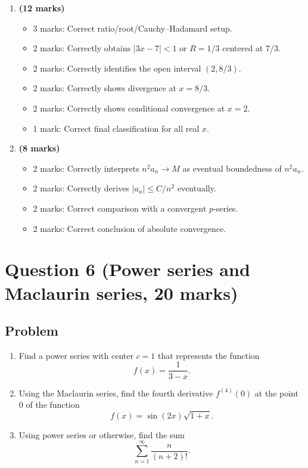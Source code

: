 \documentclass[12pt]{article}
\begin{document}
\begin{enumerate}[label=(\alph*)]
\item \textbf{(12 marks)}
\begin{itemize}
\item 3 marks: Correct ratio/root/Cauchy--Hadamard setup.
\item 2 marks: Correctly obtains $|3x-7|<1$ or $R=1/3$ centered at $7/3$.
\item 2 marks: Correctly identifies the open interval $(2,8/3)$.
\item 2 marks: Correctly shows divergence at $x=8/3$.
\item 2 marks: Correctly shows conditional convergence at $x=2$.
\item 1 mark: Correct final classification for all real $x$.
\end{itemize}

\item \textbf{(8 marks)}
\begin{itemize}
\item 2 marks: Correctly interprets $n^2a_n\to M$ as eventual boundedness of $n^2a_n$.
\item 2 marks: Correctly derives $|a_n|\le C/n^2$ eventually.
\item 2 marks: Correct comparison with a convergent $p$-series.
\item 2 marks: Correct conclusion of absolute convergence.
\end{itemize}
\end{enumerate}

\newpage
\section{Question 6 (Power series and Maclaurin series, 20 marks)}

\subsection{Problem}

\begin{enumerate}[label=(\alph*)]
\item Find a power series with center $c=1$ that represents the function
\[
f(x)=\frac1{3-x}.
\]

\item Using the Maclaurin series, find the fourth derivative $f^{(4)}(0)$ at the point $0$ of the function
\[
f(x)=\sin(2x)\sqrt{1+x}.
\]

\item Using power series or otherwise, find the sum
\[
\sum_{n=1}^{\infty}\frac{n}{(n+2)!}.
\]
\end{enumerate}
\end{document}
